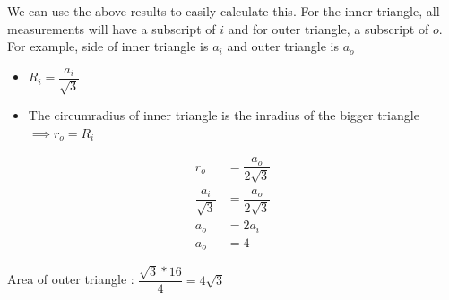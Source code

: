 We can use the above results to easily calculate this. For the inner triangle, all measurements will have a subscript of $i$ and for outer triangle, a subscript of $o$. For example, side of inner triangle is $a_i$ and outer triangle is $a_o$

\begin{itemize}
    \item $R_i = \dfrac{a_i}{\sqrt{3}}$
    \item The circumradius of inner triangle is the inradius of the bigger triangle $\implies r_o = R_i$
\end{itemize}

\begin{align*}
    r_o &= \dfrac{a_o}{2 \sqrt{3}} \\ 
    \dfrac{a_i}{\sqrt{3}} &= \dfrac{a_o}{2 \sqrt{3}} \\
    a_o &= 2 a_i \\
    a_o &= 4 \tag{$a_i = 4$ is given}
\end{align*}

Area of outer triangle : $\dfrac{\sqrt{3} * 16}{4} = 4 \sqrt{3}$

